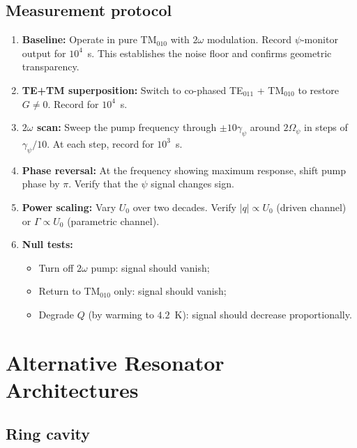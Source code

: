 \documentclass[12pt,aps,prd,twocolumn,superscriptaddress,nofootinbib]{revtex4-2}
\newcommand{\Opsi}{\Omega_\psi}
\newcommand{\gpsi}{\gamma_\psi}
\begin{document}
\subsection{Measurement protocol}

\begin{enumerate}
  \item \textbf{Baseline:} Operate in pure TM$_{010}$ with $2\omega$
    modulation.  Record $\psi$-monitor output for $10^4$~s.  This
    establishes the noise floor and confirms geometric transparency.

  \item \textbf{TE+TM superposition:} Switch to co-phased TE$_{011}$ +
    TM$_{010}$ to restore $G \neq 0$.  Record for $10^4$~s.

  \item \textbf{$2\omega$ scan:} Sweep the pump frequency through
    $\pm 10\gpsi$ around $2\Opsi$ in steps of $\gpsi/10$.  At each
    step, record for $10^3$~s.

  \item \textbf{Phase reversal:} At the frequency showing maximum
    response, shift pump phase by $\pi$.  Verify that the $\psi$
    signal changes sign.

  \item \textbf{Power scaling:} Vary $U_0$ over two decades.  Verify
    $|q| \propto U_0$ (driven channel) or $\Gamma \propto U_0$
    (parametric channel).

  \item \textbf{Null tests:}
    \begin{itemize}[noitemsep]
      \item Turn off $2\omega$ pump: signal should vanish;
      \item Return to TM$_{010}$ only: signal should vanish;
      \item Degrade $Q$ (by warming to $4.2$~K): signal should
        decrease proportionally.
    \end{itemize}
\end{enumerate}


\section{Alternative Resonator Architectures}
\label{sec:alternatives}

\subsection{Ring cavity}
\end{document}
